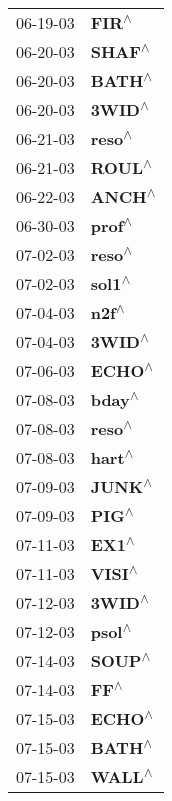 \begin{supertabular}{p{0.08\textwidth}p{0.2\textwidth}}
 06-19-03 &     \textbf{FIR\textsuperscript{$\wedge$}} \\
 06-20-03 &    \textbf{SHAF\textsuperscript{$\wedge$}} \\
 06-20-03 &    \textbf{BATH\textsuperscript{$\wedge$}} \\
 06-20-03 &    \textbf{3WID\textsuperscript{$\wedge$}} \\
 06-21-03 &    \textbf{reso\textsuperscript{$\wedge$}} \\
 06-21-03 &    \textbf{ROUL\textsuperscript{$\wedge$}} \\
 06-22-03 &    \textbf{ANCH\textsuperscript{$\wedge$}} \\
 06-30-03 &    \textbf{prof\textsuperscript{$\wedge$}} \\
 07-02-03 &    \textbf{reso\textsuperscript{$\wedge$}} \\
 07-02-03 &    \textbf{sol1\textsuperscript{$\wedge$}} \\
 07-04-03 &     \textbf{n2f\textsuperscript{$\wedge$}} \\
 07-04-03 &    \textbf{3WID\textsuperscript{$\wedge$}} \\
 07-06-03 &    \textbf{ECHO\textsuperscript{$\wedge$}} \\
 07-08-03 &    \textbf{bday\textsuperscript{$\wedge$}} \\
 07-08-03 &    \textbf{reso\textsuperscript{$\wedge$}} \\
 07-08-03 &    \textbf{hart\textsuperscript{$\wedge$}} \\
 07-09-03 &    \textbf{JUNK\textsuperscript{$\wedge$}} \\
 07-09-03 &     \textbf{PIG\textsuperscript{$\wedge$}} \\
 07-11-03 &     \textbf{EX1\textsuperscript{$\wedge$}} \\
 07-11-03 &    \textbf{VISI\textsuperscript{$\wedge$}} \\
 07-12-03 &    \textbf{3WID\textsuperscript{$\wedge$}} \\
 07-12-03 &    \textbf{psol\textsuperscript{$\wedge$}} \\
 07-14-03 &    \textbf{SOUP\textsuperscript{$\wedge$}} \\
 07-14-03 &      \textbf{FF\textsuperscript{$\wedge$}} \\
 07-15-03 &    \textbf{ECHO\textsuperscript{$\wedge$}} \\
 07-15-03 &    \textbf{BATH\textsuperscript{$\wedge$}} \\
 07-15-03 &    \textbf{WALL\textsuperscript{$\wedge$}} \\

\end{supertabular}
